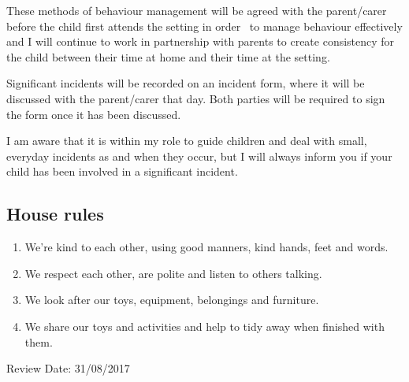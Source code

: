 These methods of behaviour management will be agreed with the
parent/carer before the child first attends the setting in order ~to
manage behaviour effectively and I will continue to work in partnership
with parents to create consistency for the child between their time at
home and their time at the setting.

Significant incidents will be recorded on an incident form, where it
will be discussed with the parent/carer that day. Both parties will be
required to sign the form once it has been discussed.

I am aware that it is within my role to guide children and deal with
small, everyday incidents as and when they occur, but I will always
inform you if your child has been involved in a significant incident.

\subsection{House rules}

\begin{enumerate}
\item
  We're kind to each other, using good manners, kind hands, feet and
  words. ~
\item
  We respect each other, are polite and listen to others talking.~
\item
  We look after our toys, equipment, belongings and furniture.~
\item
  We share our toys and activities and help to tidy away when finished
  with them.~
\end{enumerate}

Review Date: 31/08/2017


